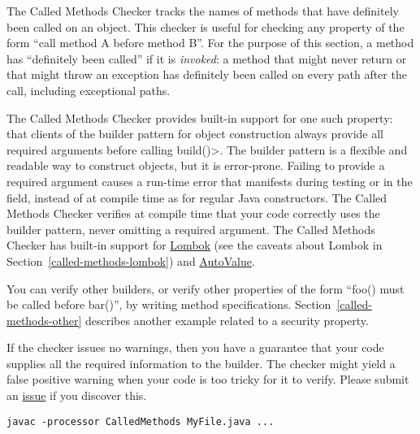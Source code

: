 \htmlhr
{}

The Called Methods Checker tracks the names of methods that have definitely
been called on an object. This checker is useful for checking any property
of the form ``call method A before method B''. For the purpose of this
section, a method has ``definitely been called'' if it is \emph{invoked}:
a method that might never return or that might throw an exception has
definitely been called on every path after the call, including exceptional paths.

The Called Methods Checker provides built-in support for one such property:
that clients of the builder pattern for object
construction always provide all required arguments before calling
\<build()>.  The builder pattern is a flexible and readable way to
construct objects, but it is error-prone.  Failing to provide
a required argument causes a run-time error that manifests during testing
or in the field, instead of at compile time as for regular Java
constructors.  The Called Methods Checker verifies at compile time that
your code correctly uses the builder pattern, never omitting a required
argument. The Called Methods Checker has built-in support for
\href{https://projectlombok.org/}{Lombok} (see the caveats about Lombok in
Section~\ref{called-methods-lombok}) and
\href{https://github.com/google/auto/blob/master/value/userguide/index.md}{AutoValue}.

You can verify other builders, or verify other properties of the form
``foo() must be called before bar()'', by writing method specifications.
Section~\ref{called-methods-other} describes another example related to a
security property.

If the checker issues no warnings, then you have a guarantee that your code
supplies all the required information to the builder.  The checker might
yield a false positive warning when your code is too tricky for it to
verify.  Please submit an
\href{https://github.com/typetools/checker-framework/issues}{issue} if you
discover this.



\begin{Verbatim}
javac -processor CalledMethods MyFile.java ...
\end{Verbatim}

